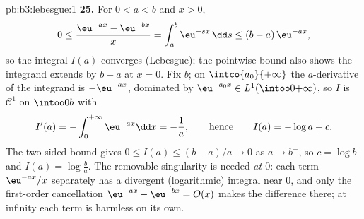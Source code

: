 \begin{solution}{pb:b3:lebesgue:1}
\textbf{25.} For $0 < a < b$ and $x > 0$,
\[
0 \leq \frac{\eu^{-ax} - \eu^{-bx}}{x}
= \int_a^b \eu^{-sx}\,\dd s \leq (b - a)\,\eu^{-ax},
\]
so the integral $I(a)$ converges (Lebesgue); the pointwise
bound also shows the integrand extends  by $b -
a$ at $x = 0$. Fix $b$; on $\intco{a_0}{+\infty}$ the
$a$-derivative of the integrand is $-\eu^{-ax}$, dominated by
$\eu^{-a_0x} \in L^1(\intoo0{+\infty})$, so $I$ is $\mathcal
C^1$ on $\intoo0b$ with
\[
I'(a) = -\int_0^{+\infty}\eu^{-ax}\dd x = -\frac1a,
\qquad\text{hence}\qquad
I(a) = -\log a + c .
\]
The two-sided bound gives $0 \leq I(a) \leq (b-a)/a \to 0$ as
$a \to b^-$, so $c = \log b$ and $I(a) = \log\frac ba$. The
removable singularity is needed \emph{at $0$}: each term
$\eu^{-ax}/x$ separately has a divergent (logarithmic)
integral near $0$, and only the first-order cancellation
$\eu^{-ax} - \eu^{-bx} = O(x)$ makes the difference
 there; at infinity each term is harmless on its
own.
\end{solution}
